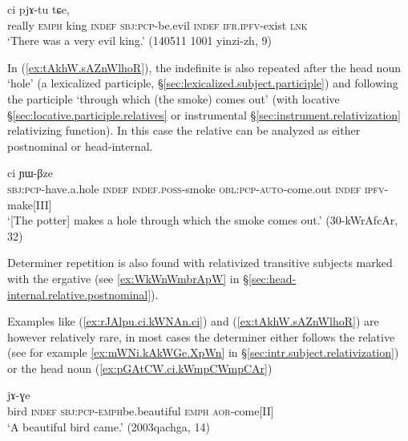 \begin{exe}
\ex \label{ex:rJAlpu.ci.kWNAn.ci}
 ci pjɤ-tu tɕe, \\
really \textsc{emph} king \textsc{indef} \textsc{sbj}:\textsc{pcp}-be.evil \textsc{indef} \textsc{ifr}.\textsc{ipfv}-exist \textsc{lnk} \\
\glt `There was a very evil king.' (140511 1001 yinzi-zh, 9)
 \end{exe} 

In (\ref{ex:tAkhW.sAZnWlhoR}), the indefinite  is also repeated after the head noun  `hole' (a lexicalized participle, §\ref{sec:lexicalized.subject.participle}) and following the participle  `through which (the smoke) comes out' (with locative §\ref{sec:locative.participle.relatives} or instrumental §\ref{sec:instrument.relativization} relativizing function). In this case the relative can be analyzed as either postnominal or head-internal.

\begin{exe}
\ex \label{ex:tAkhW.sAZnWlhoR}
 ci ɲɯ-βze \\
\textsc{sbj}:\textsc{pcp}-have.a.hole \textsc{indef} \textsc{indef}.\textsc{poss}-smoke \textsc{obl}:\textsc{pcp}-\textsc{auto}-come.out \textsc{indef} \textsc{ipfv}-make[III] \\ 
\glt `[The potter] makes a hole through which the smoke comes out.' (30-kWrAfcAr, 32)
\end{exe}

Determiner repetition is also found with relativized transitive subjects marked with the ergative (see \ref{ex:WkWnWmbrApW} in §\ref{sec:head-internal.relative.postnominal}).

Examples like (\ref{ex:rJAlpu.ci.kWNAn.ci}) and (\ref{ex:tAkhW.sAZnWlhoR}) are however relatively rare, in most cases the determiner either follows the relative (see for example  \ref{ex:mWNi.kAkWGe.XpWn} in §\ref{sec:intr.subject.relativization}) or the head noun (\ref{ex:pGAtCW.ci.kWmpCWmpCAr})
  
\begin{exe}
\ex \label{ex:pGAtCW.ci.kWmpCWmpCAr}
 jɤ-ɣe \\
bird \textsc{indef} \textsc{sbj}:\textsc{pcp}-\textsc{emph}\redp{}be.beautiful \textsc{emph} \textsc{aor}-come[II] \\
\glt `A beautiful bird came.' (2003qachga, 14)
\end{exe} 


